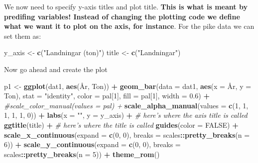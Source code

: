 \documentclass[]{article}
\newenvironment{Shaded}{\begin{snugshade}}{\end{snugshade}}
\newcommand{\KeywordTok}[1]{\textcolor[rgb]{0.13,0.29,0.53}{\textbf{#1}}}
\newcommand{\DataTypeTok}[1]{\textcolor[rgb]{0.13,0.29,0.53}{#1}}
\newcommand{\DecValTok}[1]{\textcolor[rgb]{0.00,0.00,0.81}{#1}}
\newcommand{\FloatTok}[1]{\textcolor[rgb]{0.00,0.00,0.81}{#1}}
\newcommand{\StringTok}[1]{\textcolor[rgb]{0.31,0.60,0.02}{#1}}
\newcommand{\CommentTok}[1]{\textcolor[rgb]{0.56,0.35,0.01}{\textit{#1}}}
\newcommand{\OtherTok}[1]{\textcolor[rgb]{0.56,0.35,0.01}{#1}}
\newcommand{\OperatorTok}[1]{\textcolor[rgb]{0.81,0.36,0.00}{\textbf{#1}}}
\newcommand{\NormalTok}[1]{#1}
\begin{document}
We now need to specify y-axis titles and plot title. \textbf{This is
what is meant by predifing variables! Instead of changing the plotting
code we define what we want it to plot on the axis, for instance}. For
the pike data we can set them as:

\begin{Shaded}
\begin{Highlighting}[]
\NormalTok{y_axis <-}\StringTok{ }\KeywordTok{c}\NormalTok{(}\StringTok{"Landningar (ton)"}\NormalTok{)}
\NormalTok{title  <-}\StringTok{ }\KeywordTok{c}\NormalTok{(}\StringTok{"Landningar"}\NormalTok{)}
\end{Highlighting}
\end{Shaded}

Now go ahead and create the plot

\begin{Shaded}
\begin{Highlighting}[]
\NormalTok{p1 <-}\StringTok{ }\KeywordTok{ggplot}\NormalTok{(dat1, }\KeywordTok{aes}\NormalTok{(År, Ton)) }\OperatorTok{+}
\StringTok{  }\KeywordTok{geom_bar}\NormalTok{(}\DataTypeTok{data =}\NormalTok{ dat1, }
           \KeywordTok{aes}\NormalTok{(}\DataTypeTok{x =}\NormalTok{ År, }\DataTypeTok{y =}\NormalTok{ Ton), }\DataTypeTok{stat =} \StringTok{"identity"}\NormalTok{, }\DataTypeTok{color =}\NormalTok{ pal[}\DecValTok{1}\NormalTok{], }\DataTypeTok{fill =}\NormalTok{ pal[}\DecValTok{1}\NormalTok{], }
           \DataTypeTok{width =} \FloatTok{0.6}\NormalTok{) }\OperatorTok{+}
\StringTok{  }\CommentTok{#scale_color_manual(values = pal) +}
\StringTok{  }\KeywordTok{scale_alpha_manual}\NormalTok{(}\DataTypeTok{values =} \KeywordTok{c}\NormalTok{(}\DecValTok{1}\NormalTok{, }\DecValTok{1}\NormalTok{, }\DecValTok{1}\NormalTok{, }\DecValTok{1}\NormalTok{, }\DecValTok{1}\NormalTok{, }\DecValTok{0}\NormalTok{)) }\OperatorTok{+}
\StringTok{  }\KeywordTok{labs}\NormalTok{(}\DataTypeTok{x =} \StringTok{""}\NormalTok{, }\DataTypeTok{y =}\NormalTok{ y_axis) }\OperatorTok{+}\StringTok{ }\CommentTok{# here's where the axis title is called}
\StringTok{  }\KeywordTok{ggtitle}\NormalTok{(title) }\OperatorTok{+}\StringTok{           }\CommentTok{# here's where the title is called}
\StringTok{  }\KeywordTok{guides}\NormalTok{(}\DataTypeTok{color  =} \OtherTok{FALSE}\NormalTok{) }\OperatorTok{+}
\StringTok{  }\KeywordTok{scale_x_continuous}\NormalTok{(}\DataTypeTok{expand =} \KeywordTok{c}\NormalTok{(}\DecValTok{0}\NormalTok{, }\DecValTok{0}\NormalTok{), }\DataTypeTok{breaks =}\NormalTok{ scales}\OperatorTok{::}\KeywordTok{pretty_breaks}\NormalTok{(}\DataTypeTok{n =} \DecValTok{6}\NormalTok{)) }\OperatorTok{+}
\StringTok{  }\KeywordTok{scale_y_continuous}\NormalTok{(}\DataTypeTok{expand =} \KeywordTok{c}\NormalTok{(}\DecValTok{0}\NormalTok{, }\DecValTok{0}\NormalTok{), }\DataTypeTok{breaks =}\NormalTok{ scales}\OperatorTok{::}\KeywordTok{pretty_breaks}\NormalTok{(}\DataTypeTok{n =} \DecValTok{5}\NormalTok{)) }\OperatorTok{+}
\StringTok{  }\KeywordTok{theme_rom}\NormalTok{()}
\end{Highlighting}
\end{Shaded}
\end{document}

